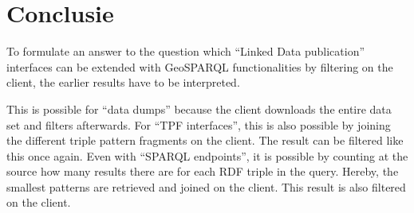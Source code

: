 \documentclass[twocolumn]{phdsymp} %
\begin{document}
\section{Conclusie}
To formulate an answer to the question which ``Linked Data publication'' interfaces can be extended with GeoSPARQL functionalities by filtering on the client, the earlier results have to be interpreted.

This is possible for ``data dumps'' because the client downloads the entire data set and filters afterwards. For ``TPF interfaces'', this is also possible by joining the different triple pattern fragments on the client. The result can be filtered like this once again. Even with ``SPARQL endpoints'', it is possible by counting at the source how many results there are for each RDF triple in the query. Hereby, the smallest patterns are retrieved and joined on the client. This result is also filtered on the client.



\end{document}
